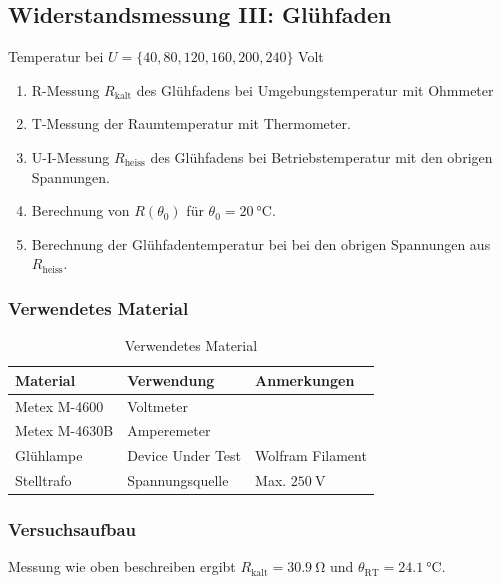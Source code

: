 \newpage
\subsection{Widerstandsmessung III: Glühfaden}\label{sec:1-3}

\begin{highlightblock}
	Temperatur bei $U=\{40, 80, 120, 160, 200, 240\}$ Volt
	\begin{enumerate}[label=\textbf{\alph*:}, ref=\alph*, noitemsep]
		\item\label{itm:1-P3-1} R-Messung $R_\mathrm{kalt}$ des Glühfadens bei Umgebungstemperatur mit Ohmmeter
		\item\label{itm:1-P3-2} T-Messung der Raumtemperatur mit Thermometer.
		\item\label{itm:1-P3-3} U-I-Messung $R_\mathrm{heiss}$ des Glühfadens bei Betriebstemperatur mit den obrigen Spannungen.
		\item\label{itm:1-P3-4} Berechnung von $R(\theta_0)$ für $\theta_0=\SI{20}{\celsius}$.
		\item\label{itm:1-P3-5} Berechnung der Glühfadentemperatur bei bei den obrigen Spannungen aus $R_\mathrm{heiss}$.
	\end{enumerate}
\end{highlightblock}

\subsubsection{Verwendetes Material}

\begin{table}[h]
	\centering
	\caption{Verwendetes Material}
	\begin{tabularx}{\textwidth}{XXX}
		\textbf{Material} & \textbf{Verwendung} & \textbf{Anmerkungen}   \\ \midrule
		Metex M-4600      & Voltmeter           &                        \\
		Metex M-4630B     & Amperemeter         &                        \\
		Glühlampe         & Device Under Test   & Wolfram Filament       \\
		Stelltrafo        & Spannungsquelle     & Max. $\SI{250}{\volt}$ \\
	\end{tabularx}
\end{table}

\subsubsection{Versuchsaufbau}
\marginref{\ref{itm:1-P3-1},~\ref{itm:1-P3-2}}
Messung wie oben beschreiben ergibt $R_\mathrm{kalt} = \SI{30.9}{\ohm}$ und
$\theta_\mathrm{RT} = \SI{24.1}{\celsius}$.

